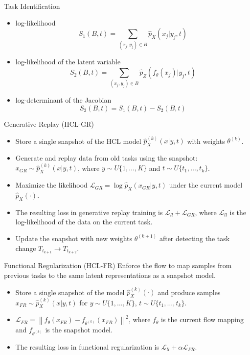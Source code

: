 \documentclass{beamer}
\begin{document}
\begin{frame}{Task Identification}
  \begin{itemize}
    \item <1-> log-likelihood
    \[
      S_1(B, t) = \sum_{(x_j, y_j) \in B} \hat{p}_X(x_j | y_j, t)
    \]
    \item <1-> log-likelihood of the latent variable 
    \[
      S_2(B, t) = \sum_{(x_j, y_j) \in B} \hat{p}_Z(f_\theta(x_j) | y_j, t)
    \]
    \item <1-> log-determinant of the Jacobian
    \[
      S_3(B, t) = S_1(B, t) - S_2(B, t)
    \]
  \end{itemize}
\end{frame}

\begin{frame}{Generative Replay (HCL-GR)}
  \begin{itemize}
    \item <1-> Store a single snapshot of the HCL model $\hat{p}_X^{(k)}(x | y, t)$ with weights $\theta^{(k)}$.
    \item <1-> Generate and replay data from old tasks using the snapshot: $x_{GR} \sim \hat{p}_X^{(k)}(x | y, t)$, where $y \sim U\{1, \dots, K\}$ and $t \sim U\{t_1, \dots, t_k\}$.
    \item <1-> Maximize the likelihood $\mathcal{L}_{GR} = \log \hat{p}_X (x_{GR} | y, t)$ under the current model $\hat{p}_X(\cdot)$.
    \item <1-> The resulting loss in generative replay training is $\mathcal{L}_{ll} + \mathcal{L}_{GR}$, where $\mathcal{L}_{ll}$ is the log-likelihood of the data on the current task.
    \item <1-> Update the snapshot with new weights $\theta^{(k+1)}$ after detecting the task change $T_{t_{k+1}} \rightarrow T_{t_{k+2}}$. 
  \end{itemize}
\end{frame}

\begin{frame}{Functional Regularization (HCL-FR)}
  Enforce the flow to map samples from previous tasks to the same latent representations as a snapshot model.

  \begin{itemize}
    \item <1-> Store a single snapshot of the model $\hat{p}_X^{(k)}(\cdot)$ and produce samples $x_{FR} \sim \hat{p}_X^{(k)}(x | y, t)$ for $y \sim U\{1, \dots, K\}$, $t \sim U\{t_1, \dots, t_k\}$.
    \item <1-> $\mathcal{L}_{FR} = \left\| f_\theta(x_{FR}) - f_{\theta^{(k)}}(x_{FR}) \right\|^2$, where $f_\theta$ is the current flow mapping and $f_{\theta^{(k)}}$ is the snapshot model.
    \item <1-> The resulting loss in functional regularization is $\mathcal{L}_{ll} + \alpha \mathcal{L}_{FR}$.
  \end{itemize}
\end{frame}
\end{document}
